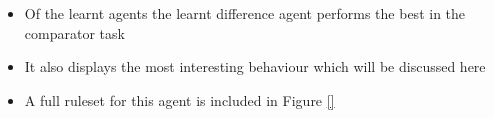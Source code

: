 \begin{itemize}
\item Of the learnt agents the learnt difference agent performs the best in the comparator task
\item It also displays the most interesting behaviour which will be discussed here
\item A full ruleset for this agent is included in Figure \ref{} 
\end{itemize}






